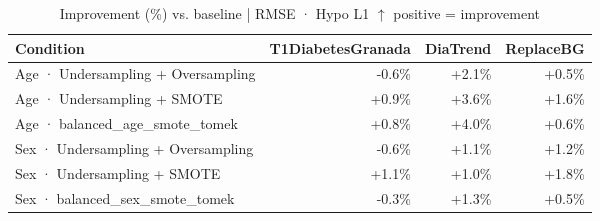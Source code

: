 \begin{table}[htbp]
\centering
\small
\caption{Improvement (\%) vs. baseline  |  RMSE · Hypo L1  $\uparrow$ positive = improvement}
\label{tab:delta_rmse_tbr_1_family_size_same_size}
\begin{tabular}{lrrr}
\toprule
\textbf{Condition} & \textbf{T1DiabetesGranada} & \textbf{DiaTrend} & \textbf{ReplaceBG} \\
\midrule
Age · Undersampling + Oversampling & \textcolor{BrickRed}{-0.6\%} & \textcolor{OliveGreen}{+2.1\%} & \textcolor{OliveGreen}{+0.5\%} \\
Age · Undersampling + SMOTE & \textcolor{OliveGreen}{+0.9\%} & \textcolor{OliveGreen}{+3.6\%} & \textcolor{OliveGreen}{+1.6\%} \\
Age · balanced_age_smote_tomek & \textcolor{OliveGreen}{+0.8\%} & \textcolor{OliveGreen}{+4.0\%} & \textcolor{OliveGreen}{+0.6\%} \\
\midrule
Sex · Undersampling + Oversampling & \textcolor{BrickRed}{-0.6\%} & \textcolor{OliveGreen}{+1.1\%} & \textcolor{OliveGreen}{+1.2\%} \\
Sex · Undersampling + SMOTE & \textcolor{OliveGreen}{+1.1\%} & \textcolor{OliveGreen}{+1.0\%} & \textcolor{OliveGreen}{+1.8\%} \\
Sex · balanced_sex_smote_tomek & \textcolor{BrickRed}{-0.3\%} & \textcolor{OliveGreen}{+1.3\%} & \textcolor{OliveGreen}{+0.5\%} \\
\bottomrule
\end{tabular}
\end{table}
